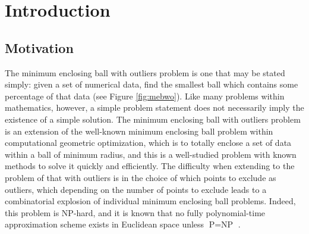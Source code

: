 \documentclass[11pt,twoside]{report}
\theoremstyle{definition}
\numberwithin{theorem}{section}
\numberwithin{definition}{section}
\numberwithin{lemma}{section}
\numberwithin{proposition}{section}
\numberwithin{equation}{section}
\numberwithin{figure}{section}
\begin{document}
\tableofcontents
\clearpage
\listoftables
\listoffigures
\listofalgorithms
\cleardoublepage

\setcounter{page}{1}

\nocite{*}
\clearpage

\chapter{Introduction}
\section{Motivation}

%
%
%   

The minimum enclosing ball with outliers problem is one that may be stated simply: given a set of numerical data, find the smallest ball which contains some percentage of that data (see Figure \ref{fig:mebwo}). Like many problems within mathematics, however, a simple problem statement does not necessarily imply the existence of a simple solution. The minimum enclosing ball with outliers problem is an extension of the well-known minimum enclosing ball problem within computational geometric optimization, which is to totally enclose a set of data within a ball of minimum radius, and this is a well-studied problem with known methods to solve it quickly and efficiently. The difficulty when extending to the problem of that with outliers is in the choice of which points to exclude as outliers, which depending on the number of points to exclude leads to a combinatorial explosion of individual minimum enclosing ball problems. Indeed, this problem is NP-hard, and it is known that no fully polynomial-time approximation scheme exists in Euclidean space unless $\text{P}=\text{NP}$ \cite{SHENMAIER201581}.
\end{document}
